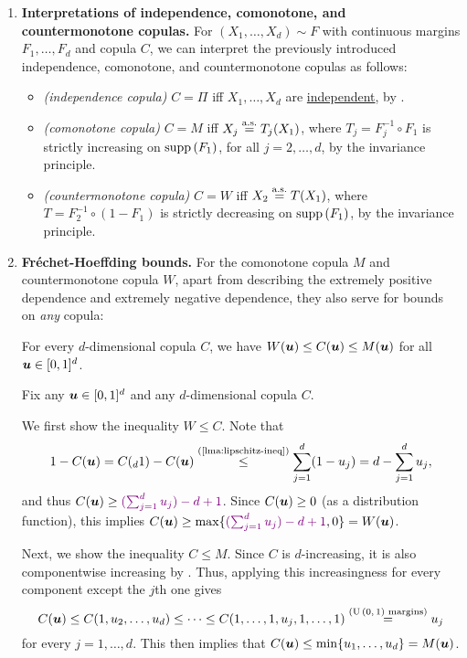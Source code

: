 \begin{enumerate}
\item\label{it:indp-comono-countermono-cop-interpret} \textbf{Interpretations
of independence, comonotone, and countermonotone copulas.} For
\((X_1,\dotsc,X_d)\sim F\) with continuous margins \(F_1,\dotsc,F_d\) and
copula \(C\), we can interpret the previously introduced independence,
comonotone, and countermonotone copulas as follows:
\begin{itemize}
\item \emph{(independence copula)} \(C=\Pi\) iff \(X_1,\dotsc,X_d\) are
\underline{independent}, by .
\item \emph{(comonotone copula)} \(C=M\) iff \(X_j\overset{\text{a.s.}}= T_j(X_1)\), where
\(T_j=F_j^{-1}\circ F_1\) is strictly increasing on \(\operatorname{supp}\left(F_1\right)\), for all
\(j=2,\dotsc,d\), by the invariance principle.
\item \emph{(countermonotone copula)} \(C=W\) iff \(X_2\overset{\text{a.s.}}= T(X_1)\), where
\(T=F_2^{-1}\circ (1-F_1)\) is strictly decreasing on \(\operatorname{supp}\left(F_1\right)\), by the
invariance principle.
\end{itemize}
\item \textbf{Fr\'echet-Hoeffding bounds.} For the comonotone copula \(M\) and
countermonotone copula \(W\), apart from describing the extremely positive
dependence and extremely negative dependence, they also serve for bounds on
\emph{any} copula:
\begin{theorem}
\label{thm:frechet-hoeffding-bounds}
For every \(d\)-dimensional copula \(C\), we have \(W(\bm{u})\le
C(\bm{u})\le M(\bm{u})\) for all \(\bm{u}\in[0,1]^{d}\).
\end{theorem}
\begin{pf}
Fix any \(\bm{u}\in[0,1]^{d}\) and any \(d\)-dimensional copula \(C\).

We first show the inequality \(W\le C\). Note that
\[
1-C(\vect{u})=C({}_{d}1)-C(\vect{u})\overset{\text{(\Cref{lma:lipschitz-ineq})}}{\le}
\sum_{j=1}^{d}(1-u_j)=d-\sum_{j=1}^{d}u_j,
\]
and thus \(C(\vect{u})\ge \vc{(\sum_{j=1}^{d}u_j)-d+1}\). Since
\(C(\bm{u})\ge 0\) (as a distribution function), this implies
\(C(\vect{u})\ge \max\{\vc{(\sum_{j=1}^{d}u_j)-d+1},0\}=W(\vect{u})\).

Next, we show the inequality \(C\le M\). Since \(C\) is \(d\)-increasing, it is
also componentwise increasing by . Thus, applying
this increasingness for every component except the \(j\)th one gives
\[
C(\bm{u})\le C(1,u_2,\dotsc,u_d)\le\dotsb\le C(1,\dotsc,1,u_j,1,\dotsc,1)
\overset{\text{(\(\operatorname{U}\left(0,1\right)\) margins)}}{=}u_j
\]
for every \(j=1,\dotsc,d\). This then implies that
\(C(\bm{u})\le\min\{u_1,\dotsc,u_d\}=M(\bm{u})\).
\end{pf}

\end{enumerate}
